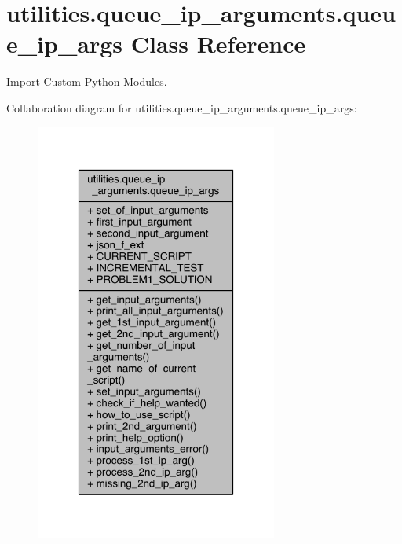 \hypertarget{classutilities_1_1queue__ip__arguments_1_1queue__ip__args}{}\section{utilities.\+queue\+\_\+ip\+\_\+arguments.\+queue\+\_\+ip\+\_\+args Class Reference}
\label{classutilities_1_1queue__ip__arguments_1_1queue__ip__args}


Import Custom Python Modules.  




Collaboration diagram for utilities.\+queue\+\_\+ip\+\_\+arguments.\+queue\+\_\+ip\+\_\+args\+:
\nopagebreak
\begin{figure}[H]
\begin{center}
\leavevmode
\includegraphics[width=226pt]{d0/dae/classutilities_1_1queue__ip__arguments_1_1queue__ip__args__coll__graph}
\end{center}
\end{figure}
